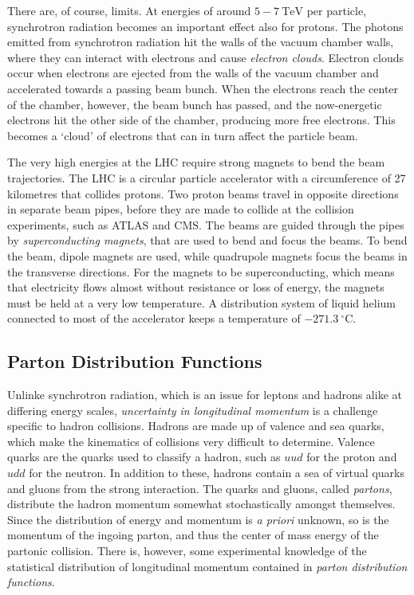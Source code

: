 \documentclass[twoside,english]{uiofysmaster}
\begin{document}
{There are, of course, limits. At energies of around $5-7~\mathrm{TeV}$ per particle, synchrotron radiation becomes an important effect also for protons. The photons emitted from synchrotron radiation hit the walls of the vacuum chamber walls, where they can interact with electrons and cause \textit{electron clouds}. Electron clouds occur when electrons are ejected from the walls of the vacuum chamber and accelerated towards a passing beam bunch. When the electrons reach the center of the chamber, however, the beam bunch has passed, and the now-energetic electrons hit the other side of the chamber, producing more free electrons. This becomes a `cloud' of electrons that can in turn affect the particle beam. 

The very high energies at the LHC require strong magnets to bend the beam trajectories. The LHC is a circular particle accelerator with a circumference of 27 kilometres that collides protons. Two proton beams travel in opposite directions in separate beam pipes, before they are made to collide at the collision experiments, such as ATLAS and CMS. The beams are guided through the pipes by \textit{superconducting magnets}, that are used to bend and focus the beams. To bend the beam, dipole magnets are used, while quadrupole magnets focus the beams in the transverse directions. For the magnets to be superconducting, which means that electricity flows almost without resistance or loss of energy, the magnets must be held at a very low temperature. A distribution system of liquid helium connected to most of the accelerator keeps a temperature of $-271.3~ ^{\circ}\mathrm{C}$. 

\subsection{Parton Distribution Functions}\label{Sec:: susy hadron : Parton Distribution Functions}

Unlinke synchrotron radiation, which is an issue for leptons and hadrons alike at differing energy scales, \textit{uncertainty in longitudinal momentum} is a challenge specific to hadron collisions. Hadrons are made up of valence and sea quarks, which make the kinematics of collisions very difficult to determine. Valence quarks are the quarks used to classify a hadron, such as $uud$ for the proton and $udd$ for the neutron. In addition to these, hadrons contain a sea of virtual quarks and gluons from the strong interaction. The quarks and gluons, called \textit{partons}, distribute the hadron momentum somewhat stochastically amongst themselves. Since the distribution of energy and momentum is \textit{a priori} unknown, so is the momentum of the ingoing parton, and thus the center of mass energy of the partonic collision. There is, however, some experimental knowledge of the statistical distribution of longitudinal momentum contained in \textit{parton distribution functions}.

}
\end{document}
